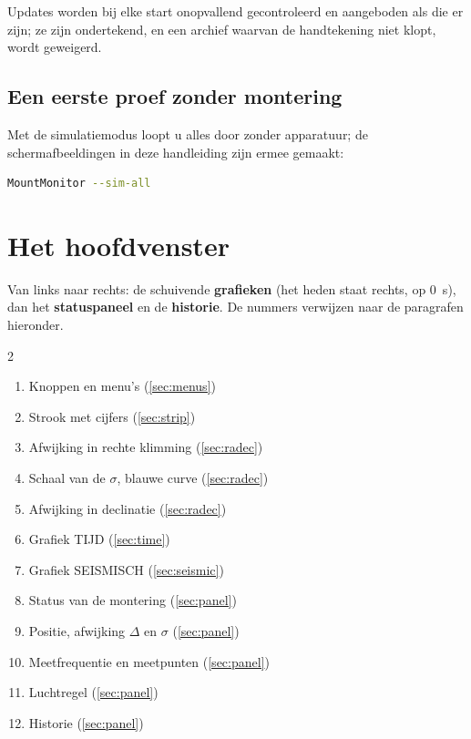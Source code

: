 Updates worden bij elke start onopvallend gecontroleerd en aangeboden als die er
zijn; ze zijn ondertekend, en een archief waarvan de handtekening niet klopt,
wordt geweigerd.

\section{Een eerste proef zonder montering}

Met de simulatiemodus loopt u alles door zonder apparatuur; de schermafbeeldingen
in deze handleiding zijn ermee gemaakt:

\begin{lstlisting}[language=bash]
MountMonitor --sim-all
\end{lstlisting}

\chapter{Het hoofdvenster}
\label{ch:window}


Van links naar rechts: de schuivende \textbf{grafieken} (het heden staat
rechts, op 0~s), dan het \textbf{statuspaneel} en de \textbf{historie}. De
nummers verwijzen naar de paragrafen hieronder.

\begin{multicols}{2}
\begin{enumerate}
  \item Knoppen en menu's (\ref{sec:menus})
  \item Strook met cijfers (\ref{sec:strip})
  \item Afwijking in rechte klimming (\ref{sec:radec})
  \item Schaal van de $\sigma$, blauwe curve (\ref{sec:radec})
  \item Afwijking in declinatie (\ref{sec:radec})
  \item Grafiek TIJD (\ref{sec:time})
  \item Grafiek SEISMISCH (\ref{sec:seismic})
  \item Status van de montering (\ref{sec:panel})
  \item Positie, afwijking $\Delta$ en $\sigma$ (\ref{sec:panel})
  \item Meetfrequentie en meetpunten (\ref{sec:panel})
  \item Luchtregel (\ref{sec:panel})
  \item Historie (\ref{sec:panel})
\end{enumerate}
\end{multicols}

